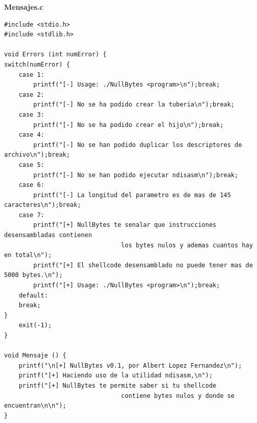 \documentclass [titlepage, 12pt]{article}
\begin{document}
\textbf{Mensajes.c}
\lstset{language=C++,caption=Mensajes.c}
\begin{lstlisting}
#include <stdio.h>
#include <stdlib.h>

void Errors (int numError) {
switch(numError) {
	case 1:
		printf("[-] Usage: ./NullBytes <program>\n");break;
	case 2:
		printf("[-] No se ha podido crear la tuberia\n");break;
	case 3:
		printf("[-] No se ha podido crear el hijo\n");break;
	case 4:
		printf("[-] No se han podido duplicar los descriptores de archivo\n");break;
	case 5:
		printf("[-] No se han podido ejecutar ndisasm\n");break;
	case 6:
		printf("[-] La longitud del parametro es de mas de 145 caracteres\n");break;
	case 7:
		printf("[+] NullBytes te senalar que instrucciones desensambladas contienen 
								los bytes nulos y ademas cuantos hay en total\n");
		printf("[+] El shellcode desensamblado no puede tener mas de 5000 bytes.\n");
		printf("[+] Usage: ./NullBytes <program>\n");break;
	default:
	break;	
}
	exit(-1);
}

void Mensaje () {
	printf("\n[+] NullBytes v0.1, por Albert Lopez Fernandez\n");
	printf("[+] Haciendo uso de la utilidad ndisasm,\n");
	printf("[+] NullBytes te permite saber si tu shellcode 
								contiene bytes nulos y donde se encuentran\n\n");
}
\end{lstlisting}\bigskip
\end{document}
